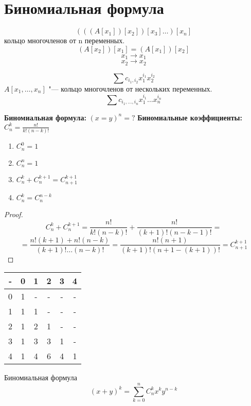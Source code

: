﻿\section{Биномиальная формула}
\begin{Def}
$$(((A[x_1])[x_2])[x_3] \ldots )[x_n]$$
кольцо многочленов от n переменных.
$$(A[x_2])[x_1] = (A[x_1])[x_2]$$
$$x_1 \to x_1$$
$$x_2 \to x_2$$

$$\sum c_{i_1, i_2}x_{1}^{i_1}x_2^{i_2}$$
$A[x_1, \ldots, x_n]$ "--- кольцо многочленов от нескольких переменных.
$$\sum c_{i_1, \ldots, i_n}x_1^{i_1}\ldots x_n^{i_n} $$
\end{Def}

{\bf Биномиальная формула:} $(x = y)^n = ?$
{\bf Биномиальные коэффициенты:} $C_n^k = \frac{n!}{k!(n - k)!}$

\begin{lemma} 
\begin{enumerate}
\item $C_n^0 = 1$
\item $C_n^n = 1$
\item $C_n^k + C_n^{k + 1} = C_{n + 1}^{k + 1}$
\item $C_n^{k} = C_{n}^{n - k}$
\end{enumerate}
\end{lemma}
\begin{proof}
$$C_n^k + C_n^{k + 1} = \frac{n!}{k!(n - k)!} + \frac{n!}{(k + 1)!(n - k - 1)!} = $$
$$= \frac{n!(k + 1) + n!(n - k)}{(k + 1)! \ldots (n - k)!} = \frac{n!(n + 1)}{(k + 1)!(n + 1 - (k + 1))!} = C_{n + 1}^{k + 1}$$
\end{proof}

\begin{Def}
\begin{tabular}{c|ccccc}
-&0&1&2&3&4\\
\hline
0&1&-&-&-&-\\
1&1&1&-&-&-\\
2&1&2&1&-&-\\
3&1&3&3&1&-\\
4&1&4&6&4&1\\
\end{tabular}
\end{Def}

\begin{theorem}{Биномиальная формула}
$$(x + y)^k = \sum_{k = 0}^nC_n^kx^ky^{n - k}$$
\end{theorem}

